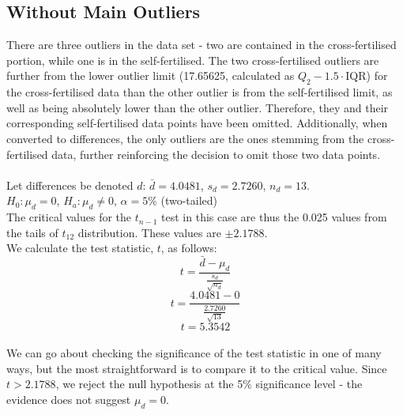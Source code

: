 \documentclass[]{article}
\begin{document}
\subsection{Without Main Outliers}
There are three outliers in the data set - two are contained in the cross-fertilised portion, while one is in the self-fertilised. The two cross-fertilised outliers are further from the lower outlier limit (17.65625, calculated as $Q_2 - 1.5\cdot$IQR) for the cross-fertilised data than the other outlier is from the self-fertilised limit, as well as being absolutely lower than the other outlier. Therefore, they and their corresponding self-fertilised data points have been omitted. Additionally, when converted to differences, the only outliers are the ones stemming from the cross-fertilised data, further reinforcing the decision to omit those two data points.
\\
\\
Let differences be denoted $d$: $\bar{d} = 4.0481$, $s_d = 2.7260$, $n_d = 13$.
\\
$H_0: \mu_d = 0$, $H_a: \mu_d \neq 0$, $\alpha = 5\%$ (two-tailed)
\\
The critical values for the $t_{n-1}$ test in this case are thus the 0.025 values from the tails of $t_{12}$ distribution. These values are $\pm 2.1788$.
\\
We calculate the test statistic, $t$, as follows:
$$t = \frac{\bar{d} - \mu_d}{\frac{s_d}{\sqrt{n_d}}}$$
$$t = \frac{4.0481 - 0}{\frac{2.7260}{\sqrt{13}}}$$
$$t = 5.3542$$
\\
We can go about checking the significance of the test statistic in one of many ways, but the most straightforward is to compare it to the critical value. Since $t > 2.1788$, we reject the null hypothesis at the 5\% significance level - the evidence does not suggest $\mu_d = 0$.
\end{document}

